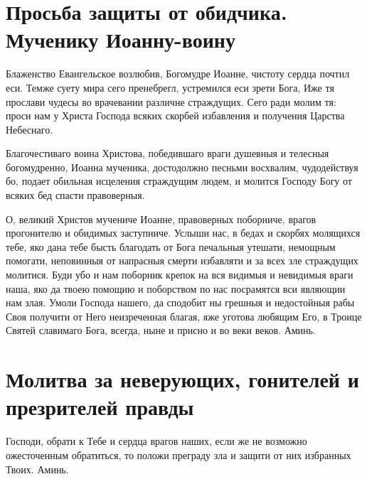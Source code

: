 \section{Просьба защиты от обидчика. Мученику Иоанну-воину}\begin{mymulticols}
 


Блаженство Евангельское возлюбив, Богомудре Иоанне, чистоту сердца почтил еси. Темже суету мира сего пренебрегл, устремился еси зрети Бога, Иже тя прослави чудесы во врачевании различне страждущих. Сего ради молим тя: проси нам у Христа Господа всяких скорбей избавления и получения Царства Небеснаго.


Благочестиваго воина Христова, победившаго враги душевныя и телесныя богомудренно, Иоанна мученика, достодолжно песньми восхвалим, чудодействуя бо, подает обильная исцеления страждущим людем, и молится Господу Богу от всяких бед спасти правоверныя.


О, великий Христов мучениче Иоанне, правоверных поборниче, врагов прогонителю и обидимых заступниче. Услыши нас, в бедах и скорбях молящихся тебе, яко дана тебе бысть благодать от Бога печальныя утешати, немощным помогати, неповинныя от напрасныя смерти избавляти и за всех зле страждущих молитися. Буди убо и нам поборник крепок на вся видимыя и невидимыя враги наша, яко да твоею помощию и поборством по нас посрамятся вси являющии нам злая. Умоли Господа нашего, да сподобит ны грешныя и недостойныя рабы Своя получити от Него неизреченная благая, яже уготова любящим Его, в Троице Святей славимаго Бога, всегда, ныне и присно и во веки веков. Аминь. 


\end{mymulticols}

\section{Молитва за неверующих, гонителей и презрителей правды}\begin{mymulticols}
 

Господи, обрати к Тебе и сердца врагов наших, если же не возможно ожесточенным обратиться, то положи преграду зла и защити от них избранных Твоих. Аминь.

\end{mymulticols}

